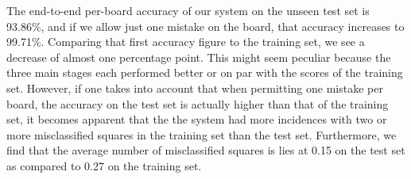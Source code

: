 \documentclass[../main.tex]{subfiles}
\begin{document}
The end-to-end per-board accuracy of our system on the unseen test set is 93.86\%, and if we allow just one mistake on the board, that accuracy increases to 99.71\%.
Comparing that first accuracy figure to the training set, we see a decrease of almost one percentage point. 
This might seem peculiar because the three main stages each performed better or on par with the scores of the training set.
However, if one takes into account that when permitting one mistake per board, the accuracy on the test set is actually higher than that of the training set, it becomes apparent that the the system had more incidences with two or more misclassified squares in the training set than the test set.
Furthermore, we find that the average number of misclassified squares is lies at 0.15 on the test set as compared to 0.27 on the training set.
\end{document}
